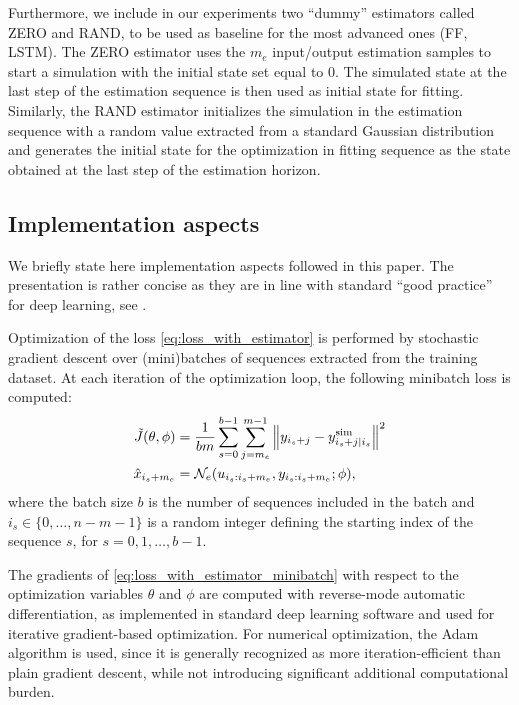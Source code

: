 \documentclass{article}
\newcommand{\NN}{\mathcal{N}} %
\newcommand{\nsamp}{n}
\newcommand{\batchsize}{b}
\newcommand{\seqlen}{m}
\newcommand{\norm}[1]{\left\lVert#1\right\rVert}
\newcommand{\simul}[1]{{#1}^{\rm sim}}
\begin{document}
Furthermore, we include in our experiments  two ``dummy'' estimators called ZERO and RAND, to be used as baseline for the most advanced ones (FF, LSTM).
The ZERO estimator uses the $\seqlen_e$ input/output estimation samples to start a simulation with the initial state set equal to 0. The simulated state at the last step of the estimation sequence is then used as initial state for fitting. Similarly, the RAND estimator initializes the simulation in the estimation sequence with a random value extracted from a standard Gaussian distribution and generates the initial state for the optimization in fitting sequence as the state obtained at the last step of the estimation horizon.  


\subsection{Implementation aspects}
We briefly state here implementation aspects followed in this paper. The presentation is
rather concise as they are in line with standard ``good practice'' for deep learning, see \cite{michelucci2018applied}.

Optimization of the loss \eqref{eq:loss_with_estimator} is performed by stochastic gradient descent over (mini)batches of sequences extracted from the training dataset. At each iteration of the optimization loop, the following minibatch loss is computed: 
\begin{subequations}
\begin{align}
\label{eq:loss_with_estimator_minibatch}
 \tilde J(\theta, \phi) &= \frac{1}{\batchsize\seqlen}\sum_{s=0}^{\batchsize -  1}
 \sum_{j=\seqlen_e}^{\seqlen-1} \norm{y_{i_s+j} - \simul{y}_{i_s+j|i_s}}^2\\
 \hat x_{i_s+\seqlen_e} &= \NN_e(u_{i_s:i_s+\seqlen_e}, y_{i_s:i_s+\seqlen_e}; \phi),
 \end{align}
\end{subequations}
where the batch size $\batchsize$ is the number of sequences included in the batch and  $i_s \in \{0,\ldots, \nsamp\! - \seqlen\! - 1\}$  is a random integer defining the starting index of the sequence $s$, for $s=0,1, \dots, \batchsize-1$.

The gradients of \eqref{eq:loss_with_estimator_minibatch} with respect to the optimization variables $\theta$ and $\phi$ are computed with reverse-mode automatic differentiation, as implemented in standard deep learning software \cite{pytorch} and used for iterative gradient-based optimization. 
For numerical optimization, the Adam algorithm \cite{kingma2014adam} is used, since it is generally recognized as more iteration-efficient than plain gradient descent, while not 
introducing significant additional computational burden.
\end{document}
